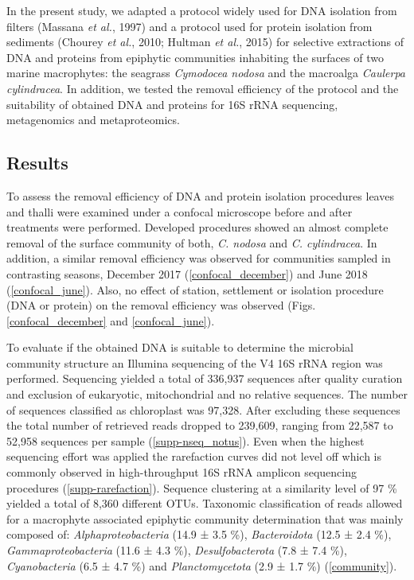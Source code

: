 \documentclass[
  12pt,
]{article}
\begin{document}
In the present study, we adapted a protocol widely used for DNA
isolation from filters (Massana \emph{et al.}, 1997) and a protocol used
for protein isolation from sediments (Chourey \emph{et al.}, 2010;
Hultman \emph{et al.}, 2015) for selective extractions of DNA and
proteins from epiphytic communities inhabiting the surfaces of two
marine macrophytes: the seagrass \emph{Cymodocea nodosa} and the
macroalga \emph{Caulerpa cylindracea}. In addition, we tested the
removal efficiency of the protocol and the suitability of obtained DNA
and proteins for 16S rRNA sequencing, metagenomics and metaproteomics.

\newpage

\hypertarget{results}{%
\subsection{Results}\label{results}}

To assess the removal efficiency of DNA and protein isolation procedures
leaves and thalli were examined under a confocal microscope before and
after treatments were performed. Developed procedures showed an almost
complete removal of the surface community of both, \emph{C. nodosa} and
\emph{C. cylindracea}. In addition, a similar removal efficiency was
observed for communities sampled in contrasting seasons, December 2017
(\autoref{confocal_december}) and June 2018 (\autoref{confocal_june}).
Also, no effect of station, settlement or isolation procedure (DNA or
protein) on the removal efficiency was observed (Figs.
\ref{confocal_december} and \ref{confocal_june}).

To evaluate if the obtained DNA is suitable to determine the microbial
community structure an Illumina sequencing of the V4 16S rRNA region was
performed. Sequencing yielded a total of 336,937 sequences after quality
curation and exclusion of eukaryotic, mitochondrial and no relative
sequences. The number of sequences classified as chloroplast was 97,328.
After excluding these sequences the total number of retrieved reads
dropped to 239,609, ranging from 22,587 to 52,958 sequences per sample
(\autoref{supp-nseq_notus}). Even when the highest sequencing effort was
applied the rarefaction curves did not level off which is commonly
observed in high-throughput 16S rRNA amplicon sequencing procedures
(\autoref{supp-rarefaction}). Sequence clustering at a similarity level
of 97 \si{\percent} yielded a total of 8,360 different OTUs. Taxonomic
classification of reads allowed for a macrophyte associated epiphytic
community determination that was mainly composed of:
\emph{Alphaproteobacteria} (14.9 ± 3.5 \si{\percent}),
\emph{Bacteroidota} (12.5 ± 2.4 \si{\percent}),
\emph{Gammaproteobacteria} (11.6 ± 4.3 \si{\percent}),
\emph{Desulfobacterota} (7.8 ± 7.4 \si{\percent}), \emph{Cyanobacteria}
(6.5 ± 4.7 \si{\percent}) and \emph{Planctomycetota} (2.9 ± 1.7
\si{\percent}) (\autoref{community}).
\end{document}
